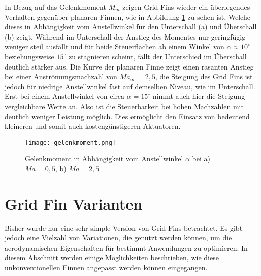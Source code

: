 In Bezug auf das Gelenkmoment $M_m$ zeigen Grid Fins wieder ein überlegendes Verhalten gegenüber planaren Finnen, wie in Abbildung \ref{abb_Mm-AoA} zu sehen ist. Welche dieses in Abhängigkeit vom Anstellwinkel für den Unterschall (a) und Überschall (b) zeigt. Während im Unterschall der Anstieg des Momentes nur geringfügig weniger steil ausfällt und für beide Steuerflächen ab einem Winkel von $\alpha \approx 10^\circ$ beziehungsweise $15^\circ$ zu stagnieren scheint, fällt der Unterschied im Überschall deutlich stärker aus. Die Kurve der planaren Finne zeigt einen rasanten Anstieg bei einer Anströmungsmachzahl von $Ma_\infty = 2,5$, die Steigung des Grid Fins ist jedoch für niedrige Anstellwinkel fast auf demselben Niveau, wie im Unterschall. Erst bei einem Anstellwinkel von circa $\alpha = 15^\circ$ nimmt auch hier die Steigung vergleichbare Werte an. Also ist die Steuerbarkeit bei hohen Machzahlen mit deutlich weniger Leistung möglich. Dies ermöglicht den Einsatz von bedeutend kleineren und somit auch kostengünstigeren Aktuatoren. 
\begin{figure}[h]
	\centering
	\texttt{[image: gelenkmoment.png]}
	\caption{Gelenkmoment in Abhängigkeit vom Anstellwinkel $\alpha$ bei a) \ensuremath{Ma=0,5}, b) $Ma=2,5$}
	\label{abb_Mm-AoA}
\end{figure}
\newpage
\section{Grid Fin Varianten}
Bisher wurde nur eine sehr simple Version von Grid Fins betrachtet. Es gibt jedoch eine Vielzahl von Variationen, die genutzt werden können, um die aerodynamischen Eigenschaften für bestimmt Anwendungen zu optimieren. In diesem Abschnitt werden einige Möglichkeiten beschrieben, wie diese unkonventionellen Finnen angepasst werden können eingegangen.
